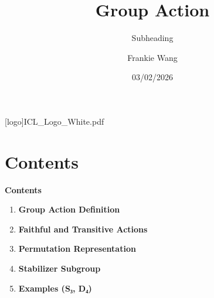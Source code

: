 \documentclass[
	aspectratio=169, %
	t, %
	onlytextwidth, %
	10pt, %
]{beamer}
\title{Group Action} %
\subtitle{Subheading} %
\author{Frankie Wang} %
\institute{Imperial College London} %
\date{03/02/2026} %
\begin{document}




\begingroup
{} %
[logo]{ICL_Logo_White.pdf} %
\frame[plain, s]{\titlepage} %
\endgroup


\section{Contents}

\begingroup
{}

\begin{frame}
	\Large\textbf{Contents}\\[0.5cm]

	\begin{enumerate}
		\item \textbf{Group Action Definition}\\[0.2cm]
		\item \textbf{Faithful and Transitive Actions}\\[0.2cm]
		\item \textbf{Permutation Representation}\\[0.2cm]
		\item \textbf{Stabilizer Subgroup}\\[0.2cm]
		\item \textbf{Examples (S₃, D₄)}
	\end{enumerate}
\end{frame}
\endgroup
\end{document}
